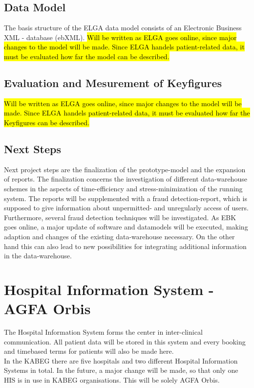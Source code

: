\documentclass[a4paper]{article}
\begin{document}
	
	
	\subsection{Data Model}
	The basis structure of the ELGA data model consists of an Electronic Business
	XML - database (ebXML).
	\hl{Will be written as ELGA goes online, since major
	changes to the model will be made.
	Since ELGA handels patient-related data, it must be evaluated how far the model can be described.}
	\subsection{Evaluation and Mesurement of Keyfigures}
	\hl{Will be written as ELGA goes online, since major changes to the model will be made.
	Since ELGA handels patient-related data, it must be evaluated how far the Keyfigures can be described.}
	\subsection{Next Steps}
	Next project steps are the finalization of the prototype-model and the expansion
	of reports. The finalization concerns the investigation of different data-warehouse
	schemes in the aspects of time-efficiency and stress-minimization of the running system.
	The reports will be supplemented with a fraud detection-report, which is supposed to 
	give information about unpermitted- and unregularly access of users. Furthermore,
	several fraud detection techniques will be investigated. As EBK goes online, a major
	update of software and datamodels will be executed, making adaption and changes of the
	existing data-warehouse necessary. On the other hand this can also lead to new possibilities
	for integrating additional information in the data-warehouse.
	
	\newpage
	
	\section{Hospital Information System - AGFA Orbis}
	The Hospital Information System forms the center in inter-clinical
	communication. All patient data will be stored in this system and every booking
	and timebased terms for patients will also be made here.\\
	In the KABEG there are five hospitals and two different Hospital Information
	Systems in total. In the future, a major change will be made, so that only one
	HIS is in use in KABEG organisations. This will be solely AGFA Orbis.
\end{document}
